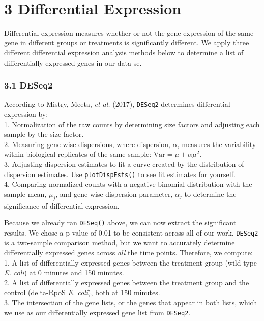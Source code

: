 \documentclass[]{article}
\begin{document}
\(~\)

\section{\texorpdfstring{\textbf{3} Differential
Expression}{3 Differential Expression}}\label{differential-expression}

Differential expression measures whether or not the gene expression of
the same gene in different groups or treatments is significantly
different. We apply three different differential expression analysis
methods below to determine a list of differentially expressed genes in
our data se.

\subsubsection{\texorpdfstring{\textbf{3.1}
DESeq2}{3.1 DESeq2}}\label{deseq2}

According to Mistry, Meeta, \emph{et al.} (2017), \texttt{DESeq2}
determines differential expression by:\\
1. Normalization of the raw counts by determining size factors and
adjusting each sample by the size factor.\\
2. Measuring gene-wise dispersions, where dispersion, \(\alpha\),
measures the variability within biological replicates of the same
sample: \(\text {Var} = \mu + \alpha\mu^2\).\\
3. Adjusting dispersion estimates to fit a curve created by the
distribution of dispersion estimates. Use \texttt{plotDispEsts()} to see
fit estimates for yourself.\\
4. Comparing normalized counts with a negative binomial distribution
with the sample mean, \(\mu_j\), and gene-wise dispersion parameter,
\(\alpha_j\) to determine the significance of differential expression.

Because we already ran \texttt{DESeq()} above, we can now extract the
significant results. We chose a p-value of 0.01 to be consistent across
all of our work. \texttt{DESeq2} is a two-sample comparison method, but
we want to accurately determine differentially expressed genes across
\emph{all} the time points. Therefore, we compute:\\
1. A list of differentially expressed genes between the treatment group
(wild-type \emph{E. coli}) at 0 minutes and 150 minutes.\\
2. A list of differentially expressed genes between the treatment group
and the control (delta-RpoS \emph{E. coli}), both at 150 minutes.\\
3. The intersection of the gene lists, or the genes that appear in both
lists, which we use as our differentially expressed gene list from
\texttt{DESeq2}.
\end{document}

